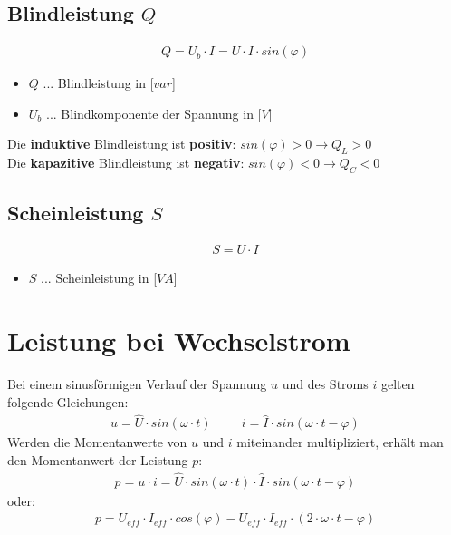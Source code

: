 \subsection{Blindleistung $Q$}
\begin{align}
    Q = U_b \cdot I = U \cdot I \cdot sin(\varphi)
\end{align}
\begin{itemize}
    \item $Q$ ... Blindleistung in [$var$]
    \item $U_b$ ... Blindkomponente der Spannung in [$V$]
\end{itemize}
Die \textbf{induktive} Blindleistung ist \textbf{positiv}: $sin(\varphi) > 0 \rightarrow Q_L > 0$ \\
Die \textbf{kapazitive} Blindleistung ist \textbf{negativ}: $sin(\varphi) < 0 \rightarrow Q_C < 0$ \\

\subsection{Scheinleistung $S$}
\begin{align}
    S = U \cdot I
\end{align}
\begin{itemize}
    \item $S$ ... Scheinleistung in [$VA$]
\end{itemize}

\newpage

\section{Leistung bei Wechselstrom}
Bei einem sinusförmigen Verlauf der Spannung $u$ und des Stroms $i$ gelten folgende Gleichungen:
\begin{align}
    u = \hat{U} \cdot sin(\omega \cdot t) \hspace{1cm} i = \hat{I} \cdot sin(\omega \cdot t - \varphi)
\end{align}
Werden die Momentanwerte von $u$ und $i$ miteinander multipliziert, erhält man den Momentanwert der Leistung $p$:
\begin{align}
    p = u \cdot i = \hat{U} \cdot sin(\omega \cdot t) \cdot \hat{I} \cdot sin(\omega \cdot t - \varphi)
\end{align}
oder:
\begin{align}
    p = U_{eff} \cdot I_{eff} \cdot cos(\varphi) - U_{eff} \cdot I_{eff} \cdot (2\cdot \omega \cdot t - \varphi)
\end{align}

